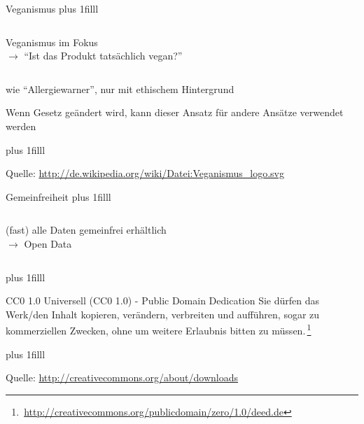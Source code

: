 \documentclass{beamer}
\begin{document}
\begin{frame}{Veganismus}
	\vskip0pt plus 1filll
	\begin{columns}
			\centering
			Veganismus im Fokus\\
			$\rightarrow$ ``Ist das Produkt tatsächlich vegan?''
			\centering
	\end{columns}
	
	\begin{block}{}
		wie ``Allergiewarner'', nur mit ethischem Hintergrund
	\end{block}
	
	\begin{alertblock}{}
		Wenn Gesetz geändert wird, kann dieser Ansatz für andere
		Ansätze verwendet werden
	\end{alertblock}
	
	\vskip0pt plus 1filll
	\par\hrulefill\par
	\tiny{Quelle:
	\url{http://de.wikipedia.org/wiki/Datei:Veganismus_logo.svg}}
\end{frame}

\begin{frame}{Gemeinfreiheit}
	\vskip0pt plus 1filll
		\begin{columns}
		\column{.60\textwidth}
			(fast) alle Daten gemeinfrei erhältlich\\
			$\rightarrow$ Open Data
		\column{.40\textwidth}
			\centering
	\end{columns}
	\vskip0pt plus 1filll
	\begin{block}{CC0 1.0 Universell (CC0 1.0) - Public Domain Dedication}
		Sie dürfen das Werk/den Inhalt kopieren, verändern, verbreiten
		und aufführen, sogar zu kommerziellen Zwecken, ohne um weitere
		Erlaubnis bitten zu
		müssen.\,\footnote{\,\url{http://creativecommons.org/publicdomain/zero/1.0/deed.de}}
	\end{block}
	\vskip0pt plus 1filll
	\par\hrulefill\par
	\tiny{Quelle: \url{http://creativecommons.org/about/downloads}}
\end{frame}
\end{document}

